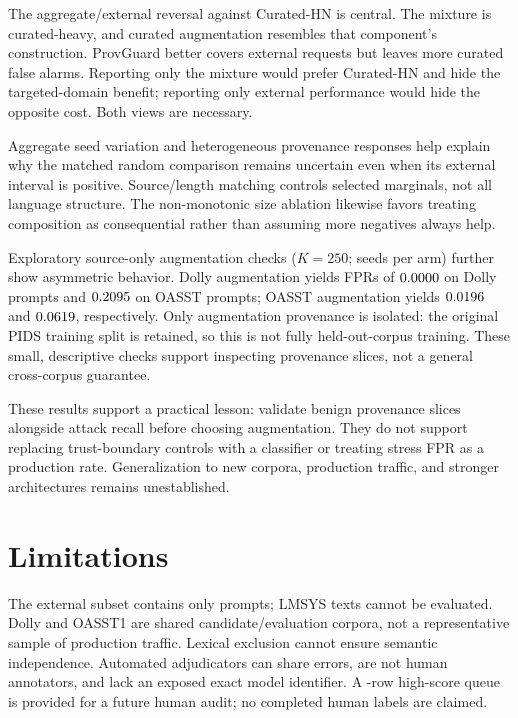 \documentclass[conference]{IEEEtran}
\begin{document}
The aggregate/external reversal against Curated-HN is central. The mixture is curated-heavy, and curated augmentation resembles that component's construction. ProvGuard better covers external requests but leaves more curated false alarms. Reporting only the mixture would prefer Curated-HN and hide the targeted-domain benefit; reporting only external performance would hide the opposite cost. Both views are necessary.

Aggregate seed variation and heterogeneous provenance responses help explain why the matched random comparison remains uncertain even when its external interval is positive. Source/length matching controls selected marginals, not all language structure. The non-monotonic size ablation likewise favors treating composition as consequential rather than assuming more negatives always help.

Exploratory source-only augmentation checks ($K=250$; \SourceSeedN{} seeds per arm) further show asymmetric behavior. Dolly augmentation yields FPRs of $0.0000$ on \NDollyExternal{} Dolly prompts and $0.2095$ on \NOasstExternal{} OASST prompts; OASST augmentation yields $0.0196$ and $0.0619$, respectively. Only augmentation provenance is isolated: the original PIDS training split is retained, so this is not fully held-out-corpus training. These small, descriptive checks support inspecting provenance slices, not a general cross-corpus guarantee.

These results support a practical lesson: validate benign provenance slices alongside attack recall before choosing augmentation. They do not support replacing trust-boundary controls with a classifier or treating stress FPR as a production rate. Generalization to new corpora, production traffic, and stronger architectures remains unestablished.

\section{Limitations}
The external subset contains only \NExternal{} prompts; \NWithheld{} LMSYS texts cannot be evaluated. Dolly and OASST1 are shared candidate/evaluation corpora, not a representative sample of production traffic. Lexical exclusion cannot ensure semantic independence. Automated adjudicators can share errors, are not human annotators, and lack an exposed exact model identifier. A \HardPGFlagN{}-row high-score queue is provided for a future human audit; no completed human labels are claimed.
\end{document}
